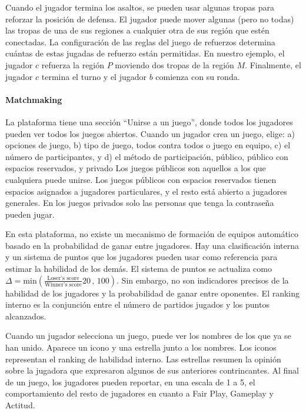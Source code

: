 \documentclass[a4paper,10pt]{book}
\theoremstyle{definition}
\begin{document}
Cuando el jugador termina los asaltos, se pueden usar algunas tropas para reforzar la posición de defensa.
%
El jugador puede mover algunas (pero no todas) las tropas de una de sus regiones a cualquier otra de sus región que estén conectadas.
%
La configuración de las reglas del juego de refuerzos determina cuántas de estas jugadas de refuerzo están permitidas.
%
En nuestro ejemplo, el jugador $c$ refuerza la región $P$ moviendo dos tropas de la región $M$.
%
Finalmente, el jugador $c$ termina el turno y el jugador $b$ comienza con su ronda.

\paragraph{Matchmaking}

La plataforma tiene una sección ``Unirse a un juego'', donde todos los jugadores pueden ver todos los juegos abiertos.
%
Cuando un jugador crea un juego, elige: a) opciones de juego, b) tipo de juego, todos contra todos o juego en equipo, c) el n\'umero de participantes, y d) el método de participación, p\'ublico, p\'ublico con espacios reservados, y privado
%
Los juegos p\'ublicos son aquellos a los que cualquiera puede unirse.
%
Los juegos p\'ublicos con espacios reservados tienen espacios asignados a jugadores particulares, y el resto está abierto a jugadores generales.
%
En los juegos privados solo las personas que tenga la contraseña pueden jugar.


En esta plataforma, no existe un mecanismo de formación de equipos automático basado en la probabilidad de ganar entre jugadores.
%
Hay una clasificación interna y un sistema de puntos que los jugadores pueden usar como referencia para estimar la habilidad de los demás.
%
El sistema de puntos se actualiza como {\small $\Delta = \text{min}(\frac{\text{Loser's score}}{\text{Winner's score}}20\,,\,100 )$}.
%
Sin embargo, no son indicadores precisos de la habilidad de los jugadores y la probabilidad de ganar entre oponentes.
%
El ranking interno es la conjunción entre el n\'umero de partidos jugados y los puntos alcanzados.


Cuando un jugador selecciona un juego, puede ver los nombres de los que ya se han unido.
%
Aparece un icono y una estrella junto a los nombres.
%
Los iconos representan el ranking de habilidad interno.
%
Las estrellas resumen la opinión sobre la jugadora que expresaron algunos de sus anteriores contrincantes.
%
Al final de un juego, los jugadores pueden reportar, en una escala de 1 a 5, el comportamiento del resto de jugadores en cuanto a Fair Play, Gameplay y Actitud.
\end{document}
